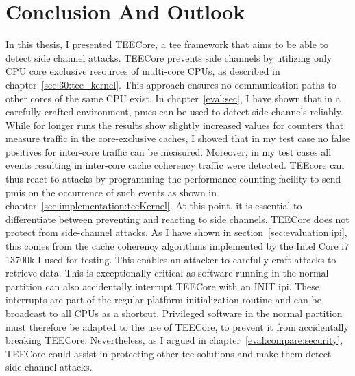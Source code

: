 \chapter{Conclusion And Outlook}
\label{sec:conclusion}



In this thesis, I presented TEECore, a \gls{tee} framework that aims to be able
to detect side channel attacks. TEECore prevents side channels by utilizing only
CPU core exclusive resources of multi-core CPUs, as described in
chapter~\ref{sec:30:tee_kernel}. This approach ensures no communication paths to
other cores of the same CPU exist. In chapter~\ref{eval:sec}, I have shown that
in a carefully crafted environment, \glspl{pmc} can be used to detect side
channels reliably. While for longer runs the results show slightly increased
values for counters that measure traffic in the core-exclusive caches, I showed
that in my test case no false positives for inter-core traffic can be measured.
Moreover, in my test cases all events resulting in inter-core cache coherency
traffic were detected. TEEcore can thus react to attacks by programming the
performance counting facility to send \glspl{pmi} on the occurrence of such
events as shown in chapter~\ref{sec:implementation:teeKernel}. At this point, it
is essential to differentiate between preventing and reacting to side channels.
TEECore does not protect from side-channel attacks. As I have shown in
section~\ref{sec:evaluation:ipi}, this comes from the cache coherency algorithms
implemented by the Intel Core i7 13700k I used for testing. This enables an
attacker to carefully craft attacks to retrieve data. This is exceptionally
critical as software running in the normal partition can also accidentally
interrupt TEECore with an INIT \gls{ipi}. These interrupts are part of the
regular platform initialization routine and can be broadcast to all CPUs as a
shortcut. Privileged software in the normal partition must therefore be adapted
to the use of TEECore, to prevent it from accidentally breaking TEECore.
Nevertheless, as I argued in chapter~\ref{eval:compare:security}, TEECore could
assist in protecting other \gls{tee} solutions and make them detect side-channel
attacks. \\

